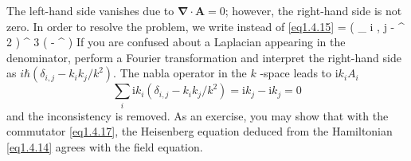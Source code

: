 \ee
The left-hand side vanishes due to $\boldsymbol { \nabla } \cdot \boldsymbol { A } = 0$; however, the right-hand side is not zero. In order to resolve the problem, we write instead of \eqref{eq1.4.15}
\be\label{eq1.4.17}
 =  \hbar \left( \delta _ { i , j } -  { \nabla ^ { 2 } } \right) \delta ^ { 3 } \left(  -  ^ { \prime } \right)
\ee
If you are confused about a Laplacian appearing in the denominator, perform a Fourier transformation and interpret the right-hand side as $i \hbar ( \delta _ { i , j } - k _ { i } k _ { j } / k ^ { 2 } )$. The nabla operator in the $k$ -space leads to i$k _ { i } A _ { i }$
\[\sum _ { i } \mathrm { i } k _ { i } \left( \delta _ { i , j } - k _ { i } k _ { j } / k ^ { 2 } \right) = \mathrm { i } k _ { j } - \mathrm { i } k _ { j } = 0 \]
and the inconsistency is removed. As an exercise, you may show that with the commutator \eqref{eq1.4.17}, the Heisenberg equation deduced from the Hamiltonian \eqref{eq1.4.14} agrees with the field equation. 

















